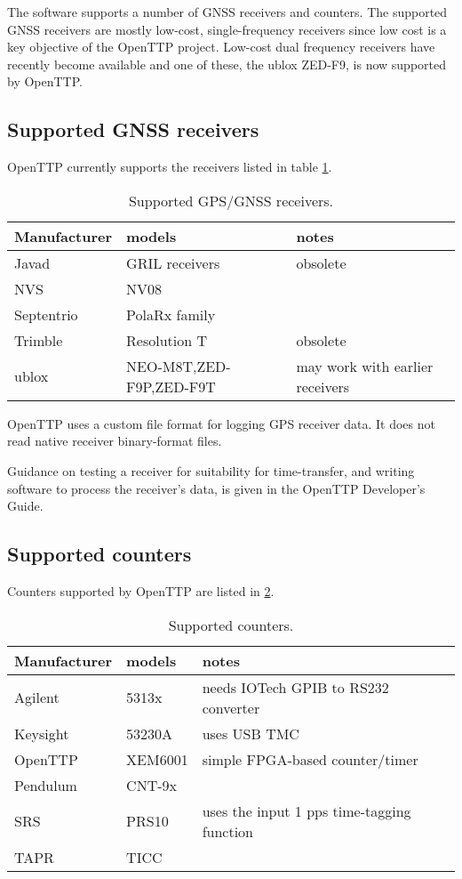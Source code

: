 The software supports a number of GNSS receivers and counters. 
The supported GNSS receivers are mostly low-cost, single-frequency receivers
since low cost is a key objective of the OpenTTP project. 
Low-cost dual frequency receivers have recently become available and one of these,
the ublox ZED-F9, is now supported by OpenTTP.

	
\subsection{Supported GNSS receivers}

OpenTTP currently supports the receivers listed in table \ref{t:receivers}.

\begin{table}[h]
\begin{tabular}{lll}
Manufacturer & models & notes \\ \hline
Javad & GRIL receivers & obsolete \\
NVS   & NV08 & \\
Septentrio & PolaRx family& \\
Trimble & Resolution T & obsolete\\
ublox & NEO-M8T,ZED-F9P,ZED-F9T & may work with earlier receivers\\
\end{tabular}
\caption{Supported GPS/GNSS receivers.\label{t:receivers}}
\end{table}

OpenTTP uses a custom file format for logging GPS receiver data. 
It does not read native receiver binary-format files.

Guidance on testing a receiver for suitability for time-transfer, and writing software to process
the receiver's data, is given in the OpenTTP Developer's Guide.

\subsection{Supported counters}

Counters supported by OpenTTP are listed in \ref{t:counters}.

\begin{table}[h]
\begin{tabular}{lll}
Manufacturer & models & notes \\ \hline
Agilent & 5313x &  needs IOTech GPIB to RS232 converter\\
Keysight & 53230A & uses USB TMC\\
OpenTTP & XEM6001 & simple FPGA-based counter/timer \\
Pendulum & CNT-9x &  \\
SRS & PRS10 & uses the input 1 pps time-tagging function\\
TAPR & TICC &\\
\end{tabular}
\caption{Supported counters. \label{t:counters}}
\end{table}


